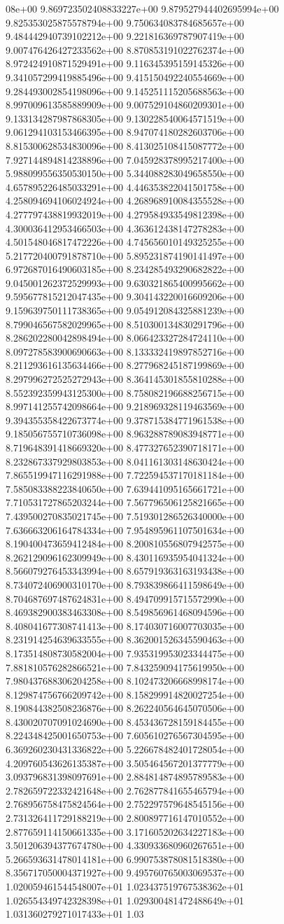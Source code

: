 08e+00	9.869723502408833227e+00	9.879527944402695994e+00	9.825353025875578794e+00	9.750634083784685657e+00	9.484442940739102212e+00	9.221816369787907419e+00	9.007476426427233562e+00	8.870853191022762374e+00	8.972424910871529491e+00	9.116345395159145326e+00	9.341057299419885496e+00	9.415150492240554669e+00	9.284493002854198096e+00	9.145251115205688563e+00	8.997009613585889909e+00	9.007529104860209301e+00	9.133134287987868305e+00	9.130228540064571519e+00	9.061294103153466395e+00	8.947074180282603706e+00	8.815300628534830096e+00	8.413025108415087772e+00	7.927144894814238896e+00	7.045928378995217400e+00	5.988099556350530150e+00	5.344088283049658550e+00	4.657895226485033291e+00	4.446353822041501758e+00	4.258094694106024924e+00	4.268968910084355528e+00	4.277797438819932019e+00	4.279584933549812398e+00	4.300036412953466503e+00	4.363612438147278283e+00	4.501548046817472226e+00	4.745656010149325255e+00	5.217720400791878710e+00	5.895231874190141497e+00	6.972687016490603185e+00	8.234285493290682822e+00	9.045001262372529993e+00	9.630321865400995662e+00	9.595677815212047435e+00	9.304143220016609206e+00	9.159639750111738365e+00	9.054912084325881239e+00	8.799046567582029965e+00	8.510300134830291796e+00	8.286202280042898494e+00	8.066423327284724110e+00	8.097278583900690663e+00	8.133332419897852716e+00	8.211293616135634466e+00	8.277968245187199869e+00	8.297996272525272943e+00	8.364145301855810288e+00	8.552392359943125300e+00	8.758082196688256715e+00	8.997141255742098664e+00	9.218969328119463569e+00	9.394355358422673774e+00	9.378715384771961538e+00	9.185056755710736098e+00	8.963288789083948771e+00	8.719648391418669320e+00	8.477327652390718171e+00	8.232867337929803853e+00	8.041161303148630424e+00	7.865519947116291988e+00	7.722594537170181184e+00	7.585083388223840650e+00	7.639441095165661721e+00	7.710531727865203244e+00	7.567796506125821665e+00	7.439500270835021745e+00	7.519301286526340000e+00	7.636663206164784334e+00	7.954895961107501634e+00	8.190400473659412484e+00	8.200810556807942575e+00	8.262129096162309949e+00	8.430116935954041324e+00	8.566079276453343994e+00	8.657919363163193438e+00	8.734072406900310170e+00	8.793839866411598649e+00	8.704687697487624831e+00	8.494709915715572990e+00	8.469382900383463308e+00	8.549856961468094596e+00	8.408041677308741413e+00	8.174030716007703035e+00	8.231914254639633555e+00	8.362001526345590463e+00	8.173514808730582004e+00	7.935319953023344475e+00	7.881810576282866521e+00	7.843259094175619950e+00	7.980437688306204258e+00	8.102473206668998174e+00	8.129874756766209742e+00	8.158299914820027254e+00	8.190844382508236876e+00	8.262240564645070506e+00	8.430020707091024690e+00	8.453436728159184455e+00	8.224348425001650753e+00	7.605610276567304595e+00	6.369260230431336822e+00	5.226678482401728054e+00	4.209760543626135387e+00	3.505464567201377779e+00	3.093796831398097691e+00	2.884814874895789583e+00	2.782659722332421648e+00	2.762877841655465794e+00	2.768956758475824564e+00	2.752297579648545156e+00	2.731326411729188219e+00	2.800897716147010552e+00	2.877659114150661335e+00	3.171605202634227183e+00	3.501206394377674780e+00	4.330933680960267651e+00	5.266593631478014181e+00	6.990753878081518380e+00	8.356717050004371927e+00	9.495760765003069537e+00	1.020059461544548007e+01	1.023437519767538362e+01	1.026554349742328398e+01	1.029300481472488649e+01	1.031360279271017433e+01	1.03